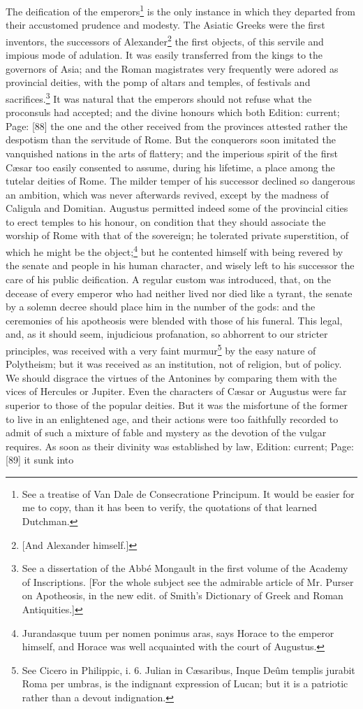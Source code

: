 The deification of the emperors\footnote{See a treatise of Van Dale de Consecratione Principum. It would be easier for me to copy, than it has been to verify, the quotations of that learned Dutchman.} is the only instance in which they departed from their accustomed prudence and modesty. The Asiatic Greeks were the first inventors, the successors of Alexander\footnote{[And Alexander himself.]} the first objects, of this servile and impious mode of adulation. It was easily transferred from the kings to the governors of Asia; and the Roman magistrates very frequently were adored as provincial deities, with the pomp of altars and temples, of festivals and sacrifices.\footnote{See a dissertation of the Abbé Mongault in the first volume of the Academy of Inscriptions. [For the whole subject see the admirable article of Mr. Purser on Apotheosis, in the new edit. of Smith\texthebrew{}’s Dictionary of Greek and Roman Antiquities.]} It was natural that the emperors should not refuse what the proconsuls had accepted; and the divine honours which both Edition: current; Page: [88] the one and the other received from the provinces attested rather the despotism than the servitude of Rome. But the conquerors soon imitated the vanquished nations in the arts of flattery; and the imperious spirit of the first Cæsar too easily consented to assume, during his lifetime, a place among the tutelar deities of Rome. The milder temper of his successor declined so dangerous an ambition, which was never afterwards revived, except by the madness of Caligula and Domitian. Augustus permitted indeed some of the provincial cities to erect temples to his honour, on condition that they should associate the worship of Rome with that of the sovereign; he tolerated private superstition, of which he might be the object;\footnote{Jurandasque tuum per nomen ponimus aras, says Horace to the emperor himself, and Horace was well acquainted with the court of Augustus.} but he contented himself with being revered by the senate and people in his human character, and wisely left to his successor the care of his public deification. A regular custom was introduced, that, on the decease of every emperor who had neither lived nor died like a tyrant, the senate by a solemn decree should place him in the number of the gods: and the ceremonies of his apotheosis were blended with those of his funeral. This legal, and, as it should seem, injudicious profanation, so abhorrent to our stricter principles, was received with a very faint murmur\footnote{See Cicero in Philippic, i. 6. Julian in Cæsaribus, Inque Deûm templis jurabit Roma per umbras, is the indignant expression of Lucan; but it is a patriotic rather than a devout indignation.} by the easy nature of Polytheism; but it was received as an institution, not of religion, but of policy. We should disgrace the virtues of the Antonines by comparing them with the vices of Hercules or Jupiter. Even the characters of Cæsar or Augustus were far superior to those of the popular deities. But it was the misfortune of the former to live in an enlightened age, and their actions were too faithfully recorded to admit of such a mixture of fable and mystery as the devotion of the vulgar requires. As soon as their divinity was established by law, Edition: current; Page: [89] it sunk into 